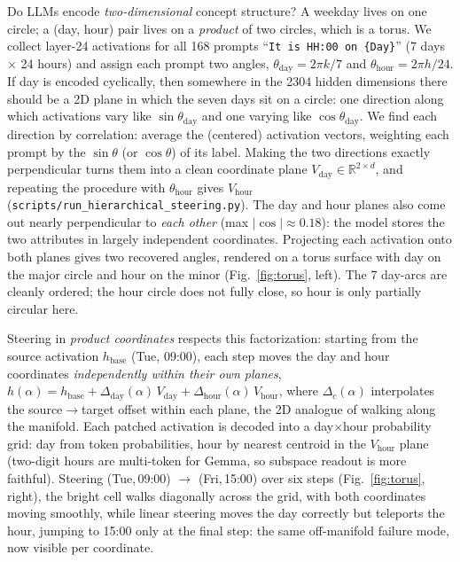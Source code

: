 \documentclass[10pt]{article}
\begin{document}
Do LLMs encode \emph{two-dimensional} concept structure? A weekday lives on
one circle; a (day, hour) pair lives on a \emph{product} of two circles,
which is a torus. We collect layer-24 activations for all 168 prompts ``\texttt{It is
HH:00 on \{Day\}}'' (7 days $\times$ 24 hours) and assign each prompt two
angles, $\theta_{\mathrm{day}}=2\pi k/7$ and $\theta_{\mathrm{hour}}=2\pi
h/24$. If day is encoded cyclically, then somewhere in the 2304 hidden dimensions
there should be a 2D plane in which the seven days sit on a circle: one
direction along which activations vary like $\sin\theta_{\mathrm{day}}$ and
one varying like $\cos\theta_{\mathrm{day}}$. We find each direction by
correlation: average the (centered) activation vectors, weighting each prompt
by the $\sin\theta$ (or $\cos\theta$) of its label. Making the two
directions exactly perpendicular turns them into a clean coordinate plane
$V_{\mathrm{day}}\in\mathbb{R}^{2\times d}$, and repeating the procedure
with $\theta_{\mathrm{hour}}$ gives $V_{\mathrm{hour}}$
(\texttt{scripts/run\_hierarchical\_steering.py}). The day and hour planes
also come out nearly perpendicular to \emph{each other} (max
$|\cos|\approx0.18$): the model stores the two attributes in largely
independent coordinates. Projecting each activation onto both planes gives two recovered angles,
rendered on a torus surface with day on the major circle and hour on the
minor (Fig.~\ref{fig:torus}, left). The 7 day-arcs are cleanly ordered; the hour
circle does not fully close, so hour is only partially circular here.

Steering in \emph{product coordinates} respects this factorization: starting
from the source activation $h_{\mathrm{base}}$ (Tue, 09:00), each step moves
the day and hour coordinates \emph{independently within their own planes},
$h(\alpha) = h_{\mathrm{base}} +
\Delta_{\mathrm{day}}(\alpha)\,V_{\mathrm{day}} +
\Delta_{\mathrm{hour}}(\alpha)\,V_{\mathrm{hour}}$, where
$\Delta_c(\alpha)$ interpolates the source$\to$target offset within each
plane, the 2D analogue of walking along the manifold. Each patched activation is decoded into a day$\times$hour probability grid:
day from token probabilities, hour by nearest centroid in the
$V_{\mathrm{hour}}$ plane (two-digit hours are multi-token for Gemma, so
subspace readout is more faithful). Steering (Tue,\,09:00) $\to$
(Fri,\,15:00) over six steps (Fig.~\ref{fig:torus}, right), the bright cell
walks diagonally across the grid, with both coordinates moving smoothly,
while linear steering moves the day correctly but teleports the hour, jumping to 15:00 only at the
final step: the same off-manifold failure mode, now visible per coordinate.
\end{document}
